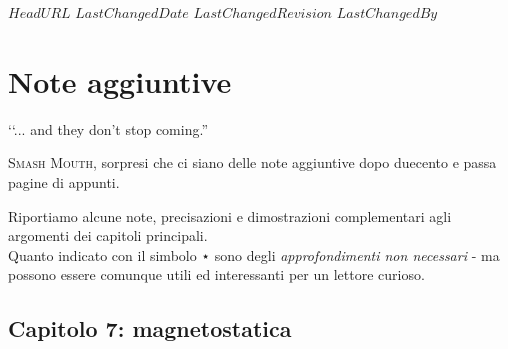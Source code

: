 \svnidlong
{$HeadURL$}
{$LastChangedDate$}
{$LastChangedRevision$}
{$LastChangedBy$}

\chapter{Note aggiuntive}
\begin{introduction}
‘‘... and they don't stop coming.''
\begin{flushright}
	\textsc{Smash Mouth,} sorpresi che ci siano delle note aggiuntive dopo duecento e passa pagine di appunti.
\end{flushright}
\end{introduction}

\noindent Riportiamo alcune note, precisazioni e dimostrazioni complementari agli argomenti dei capitoli principali.\\
Quanto indicato con il simbolo ⋆ sono degli \textit{approfondimenti non necessari} - ma possono essere comunque utili ed interessanti per un lettore curioso.
\section{Capitolo 7: magnetostatica}
